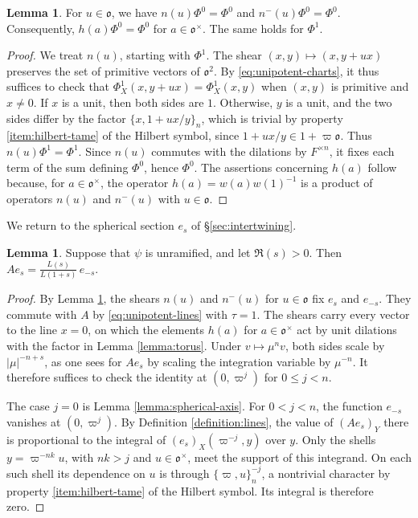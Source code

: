 \documentclass[reqno]{amsart}
\theoremstyle{plain}
\theoremstyle{definition}
\theoremstyle{itplain}
\newtheorem{lemma}[theorem]{Lemma}
\numberwithin{equation}{section}
\numberwithin{theorem}{section}
\begin{document}
\begin{lemma}\label{lemma:basic-vector-invariant}
  For $u \in \mathfrak{o}$, we have $n(u) \Phi^0 = \Phi^0$ and $n^-(u) \Phi^0 = \Phi^0$.  Consequently, $h(a) \Phi^0 = \Phi^0$ for $a \in \mathfrak{o}^\times$.  The same holds for $\Phi^1$.
\end{lemma}
\begin{proof}
  We treat $n(u)$, starting with $\Phi^1$.  The shear $(x, y) \mapsto (x, y + u x)$ preserves the set of primitive vectors of $\mathfrak{o}^2$.  By \eqref{eq:unipotent-charts}, it thus suffices to check that $\Phi^1_X(x, y + u x) = \Phi^1_X(x, y)$ when $(x, y)$ is primitive and $x \neq 0$.  If $x$ is a unit, then both sides are $1$.  Otherwise, $y$ is a unit, and the two sides differ by the factor $\{x, 1 + u x / y\}_n$, which is trivial by property \eqref{item:hilbert-tame} of the Hilbert symbol, since $1 + u x / y \in 1 + \varpi \mathfrak{o}$.  Thus $n(u) \Phi^1 = \Phi^1$.  Since $n(u)$ commutes with the dilations by $F^{\times n}$, it fixes each term of the sum defining $\Phi^0$, hence $\Phi^0$.  The assertions concerning $h(a)$ follow because, for $a \in \mathfrak{o}^\times$, the operator $h(a) = w(a) w(1)^{-1}$ is a product of operators $n(u)$ and $n^-(u)$ with $u \in \mathfrak{o}$.
\end{proof}

We return to the spherical section $e_s$ of \S\ref{sec:intertwining}.

\begin{lemma}\label{lemma:spherical}
  Suppose that $\psi$ is unramified, and let $\Re(s) > 0$.  Then $A e_s = \frac{L(s)}{L(1 + s)} \, e_{-s}$.
\end{lemma}
\begin{proof}
  By Lemma \ref{lemma:basic-vector-invariant}, the shears $n(u)$ and $n^-(u)$ for $u \in \mathfrak{o}$ fix $e_s$ and $e_{-s}$.  They commute with $A$ by \eqref{eq:unipotent-lines} with $\tau = 1$.  The shears carry every vector to the line $x = 0$, on which the elements $h(a)$ for $a \in \mathfrak{o}^\times$ act by unit dilations with the factor in Lemma \ref{lemma:torus}.  Under $v \mapsto \mu^n v$, both sides scale by $\lvert \mu \rvert^{-n+s}$, as one sees for $A e_s$ by scaling the integration variable by $\mu^{-n}$.  It therefore suffices to check the identity at $(0, \varpi^j)$ for $0 \leq j < n$.

  The case $j = 0$ is Lemma \ref{lemma:spherical-axis}.  For $0 < j < n$, the function $e_{-s}$ vanishes at $(0, \varpi^j)$.  By Definition \ref{definition:lines}, the value of $(A e_s)_Y$ there is proportional to the integral of $(e_s)_X(\varpi^{-j}, y)$ over $y$.  Only the shells $y = \varpi^{-nk} u$, with $nk > j$ and $u \in \mathfrak{o}^\times$, meet the support of this integrand.  On each such shell its dependence on $u$ is through $\{\varpi, u\}_n^{-j}$, a nontrivial character by property \eqref{item:hilbert-tame} of the Hilbert symbol.  Its integral is therefore zero.
\end{proof}
\end{document}
